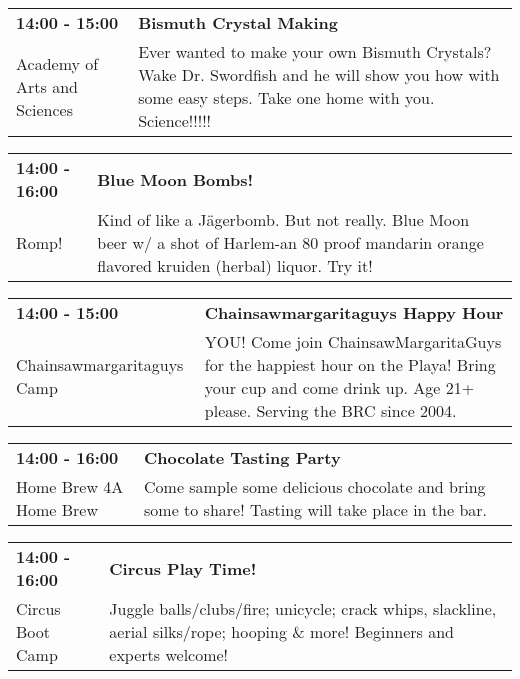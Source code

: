\begin{tabular}{ p{1in} p{2.2in} }
    \textbf{14:00 - 15:00} & \textbf{Bismuth Crystal Making} \\
    Academy of Arts and Sciences \newline  & Ever wanted to make your own Bismuth Crystals?  Wake Dr. Swordfish and he will show you how with some easy steps. Take one home with you. Science!!!!! \\
    \hline 
\end{tabular}
    
\begin{tabular}{ p{1in} p{2.2in} }
    \textbf{14:00 - 16:00} & \textbf{Blue Moon Bombs!} \\
    Romp! \newline  & Kind of like a J\"agerbomb.  But not really.  Blue Moon beer w/ a shot of Harlem-an 80 proof mandarin orange flavored kruiden (herbal) liquor.  Try it! \\
    \hline 
\end{tabular}
    
\begin{tabular}{ p{1in} p{2.2in} }
    \textbf{14:00 - 15:00} & \textbf{Chainsawmargaritaguys Happy Hour} \\
    Chainsawmargaritaguys Camp \newline  & YOU! Come join ChainsawMargaritaGuys for the happiest hour on the Playa! Bring your cup and come drink up. Age 21+ please. Serving the BRC since 2004. \\
    \hline 
\end{tabular}
    
\begin{tabular}{ p{1in} p{2.2in} }
    \textbf{14:00 - 16:00} & \textbf{Chocolate Tasting Party} \\
    Home Brew 4A Home Brew \newline  & Come sample some delicious chocolate and bring some to share! Tasting will take place in the bar. \\
    \hline 
\end{tabular}
    
\begin{tabular}{ p{1in} p{2.2in} }
    \textbf{14:00 - 16:00} & \textbf{Circus Play Time!} \\
    Circus Boot Camp \newline  & Juggle balls/clubs/fire; unicycle; crack whips, slackline, aerial silks/rope; hooping \& more! Beginners and experts welcome! \\
    \hline 
\end{tabular}
    
